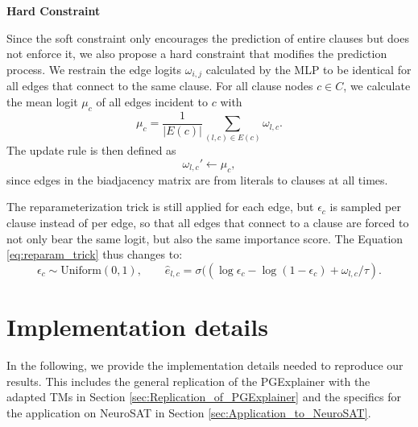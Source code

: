 \textbf{Hard Constraint}\par
Since the soft constraint only encourages the prediction of entire clauses but does not enforce it, we also propose a hard constraint that modifies the prediction process. We restrain the edge logits $\omega_{i,j}$ calculated by the MLP to be identical for all edges that connect to the same clause. %
For all clause nodes $c \in C$, we calculate the mean logit $\mu_c$ of all edges incident to $c$ with
\begin{equation}
    \mu_c = \frac{1}{|E(c)|} \sum_{(l,c)\in E(c)}\omega_{l,c}.
\end{equation}
The update rule is then defined as 
\begin{equation}
    \omega_{l,c}'\leftarrow \mu_c,
\end{equation}
since edges in the biadjacency matrix are from literals to clauses at all times.


The reparameterization trick is still applied for each edge, but $\epsilon_c$ is sampled per clause instead of per edge, so that all edges that connect to a clause are forced to not only bear the same logit, but also the same importance score. The Equation \ref{eq:reparam_trick} thus changes to:
\begin{equation}
    \epsilon_c \sim \text{Uniform}(0,1), \qquad \hat{e}_{l,c}=\sigma((\log \epsilon_c - \log(1-\epsilon_c)+\omega_{l,c}/\tau).
\end{equation}


\section{Implementation details}
\label{sec:implementation_details}
In the following, we provide the implementation details needed to reproduce our results. This includes the general replication of the PGExplainer \cite{luo2020parameterized} with the adapted \acp{TM} in Section \ref{sec:Replication_of_PGExplainer} and the specifics for the application on NeuroSAT \cite{selsam2018learning} in Section \ref{sec:Application_to_NeuroSAT}.


